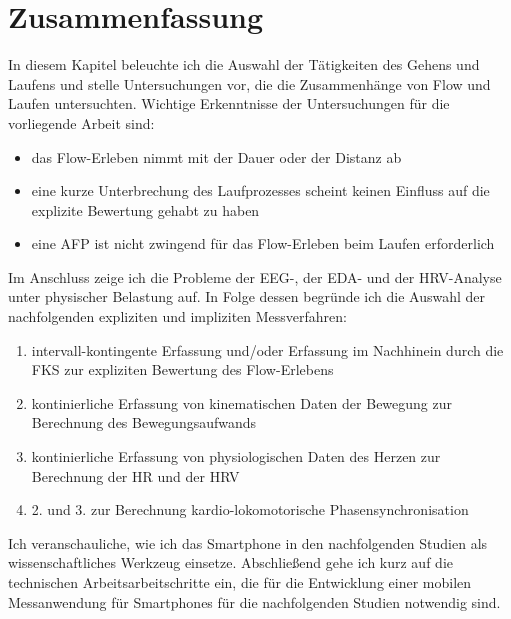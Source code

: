 

\section{Zusammenfassung} 

\label{sec:zusammenfassung_4}

In diesem Kapitel beleuchte ich die Auswahl der Tätigkeiten des Gehens und Laufens und stelle Untersuchungen vor, die die Zusammenhänge von Flow und Laufen untersuchten. Wichtige Erkenntnisse der Untersuchungen für die vorliegende Arbeit sind:
\begin{itemize}
	
	\item das Flow-Erleben nimmt mit der Dauer oder der Distanz ab
	
	\item eine kurze Unterbrechung des Laufprozesses scheint keinen Einfluss auf die explizite Bewertung gehabt zu haben
	
	\item eine \ac{AFP} ist nicht zwingend für das Flow-Erleben beim Laufen erforderlich 
\end{itemize}

Im Anschluss zeige ich die Probleme der \ac{EEG}-, der \ac{EDA}- und der \ac{HRV}-Analyse unter physischer Belastung auf. In Folge dessen begründe ich die Auswahl der nachfolgenden expliziten und impliziten Messverfahren:
\begin{enumerate}
	
	\item intervall-kontingente Erfassung und/oder Erfassung im Nachhinein durch die \ac{FKS} zur expliziten Bewertung des Flow-Erlebens
	
	\item kontinierliche Erfassung von kinematischen Daten der Bewegung zur Berechnung des Bewegungsaufwands
	
	\item kontinierliche Erfassung von physiologischen Daten des Herzen zur Berechnung der \ac{HR} und der \ac{HRV}
	
	\item 2. und 3. zur Berechnung kardio-lokomotorische Phasensynchronisation
\end{enumerate}

Ich veranschauliche, wie ich das Smartphone in den nachfolgenden Studien als wissenschaftliches Werkzeug einsetze. Abschließend gehe ich kurz auf die technischen Arbeitsarbeitschritte ein, die für die Entwicklung einer mobilen Messanwendung für Smartphones für die nachfolgenden Studien notwendig sind.

